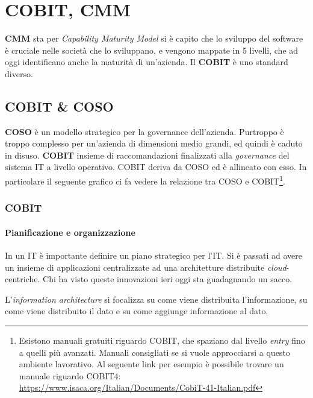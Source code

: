 \chapter{COBIT, CMM}

\textbf{CMM} sta per \textit{Capability Maturity Model} si è capito che lo 
sviluppo del software è cruciale nelle società che lo sviluppano, e vengono 
mappate in 5 livelli, che ad oggi identificano anche la maturità di un'azienda. 
Il \textbf{COBIT} è uno standard diverso.

\section{COBIT \& COSO}

\textbf{COSO} è un modello strategico per la governance dell'azienda. Purtroppo 
è troppo complesso per un'azienda di dimensioni medio grandi, ed quindi è caduto 
in disuso.
\textbf{COBIT} insieme di raccomandazioni finalizzati alla \textit{governance} 
del sistema IT a livello operativo.
COBIT deriva da COSO ed è allineato con esso. In particolare il seguente grafico 
ci fa vedere la relazione tra COSO e COBIT\footnote{Esistono manuali gratuiti 
riguardo COBIT, che spaziano dal livello \textit{entry} fino a quelli più 
avanzati. Manuali consigliati se si vuole approcciarsi a questo ambiente 
lavorativo. Al seguente link per esempio è possibile trovare un manuale riguardo 
COBIT4:  \url{https://www.isaca.org/Italian/Documents/CobiT-41-Italian.pdf}}.

\subsection{COBIT}

\subsubsection{Pianificazione e organizzazione}

In un IT è importante definire un piano strategico per l'IT. Si è passati ad 
avere un insieme di applicazioni centralizzate ad una architetture distribuite 
\textit{cloud}-centriche. Chi ha visto queste innovazioni ieri oggi sta 
guadagnando un sacco.

L'\textit{information architecture} si focalizza su come viene distribuita 
l'informazione, su come viene distribuito il dato e su come aggiunge 
informazione al dato.

